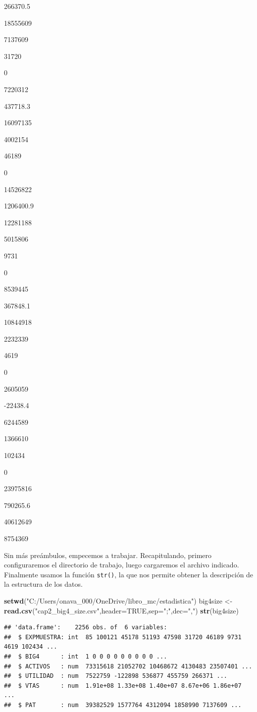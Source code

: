 \documentclass[]{book}
\newenvironment{Shaded}{\begin{snugshade}}{\end{snugshade}}
\newcommand{\KeywordTok}[1]{\textcolor[rgb]{0.13,0.29,0.53}{\textbf{#1}}}
\newcommand{\DataTypeTok}[1]{\textcolor[rgb]{0.13,0.29,0.53}{#1}}
\newcommand{\StringTok}[1]{\textcolor[rgb]{0.31,0.60,0.02}{#1}}
\newcommand{\OtherTok}[1]{\textcolor[rgb]{0.56,0.35,0.01}{#1}}
\newcommand{\NormalTok}[1]{#1}
\begin{document}
266370.5

18555609

7137609

31720

0

7220312

437718.3

16097135

4002154

46189

0

14526822

1206400.9

12281188

5015806

9731

0

8539445

367848.1

10844918

2232339

4619

0

2605059

-22438.4

6244589

1366610

102434

0

23975816

790265.6

40612649

8754369

Sin más preámbulos, empecemos a trabajar. Recapitulando, primero
configuraremos el directorio de trabajo, luego cargaremos el archivo
indicado. Finalmente usamos la función \texttt{str()}, la que nos
permite obtener la descripción de la estructura de los datos.

\begin{Shaded}
\begin{Highlighting}[]
\KeywordTok{setwd}\NormalTok{(}\StringTok{"C:/Users/onava_000/OneDrive/libro_mc/estadistica"}\NormalTok{)}
\NormalTok{big4size <-}\StringTok{ }\KeywordTok{read.csv}\NormalTok{(}\StringTok{"cap2_big4_size.csv"}\NormalTok{,}\DataTypeTok{header=}\OtherTok{TRUE}\NormalTok{,}\DataTypeTok{sep=}\StringTok{";"}\NormalTok{,}\DataTypeTok{dec=}\StringTok{","}\NormalTok{)}
\KeywordTok{str}\NormalTok{(big4size)}
\end{Highlighting}
\end{Shaded}

\begin{verbatim}
## 'data.frame':    2256 obs. of  6 variables:
##  $ EXPMUESTRA: int  85 100121 45178 51193 47598 31720 46189 9731 4619 102434 ...
##  $ BIG4      : int  1 0 0 0 0 0 0 0 0 0 ...
##  $ ACTIVOS   : num  73315618 21052702 10468672 4130483 23507401 ...
##  $ UTILIDAD  : num  7522759 -122898 536877 455759 266371 ...
##  $ VTAS      : num  1.91e+08 1.33e+08 1.40e+07 8.67e+06 1.86e+07 ...
##  $ PAT       : num  39382529 1577764 4312094 1858990 7137609 ...
\end{verbatim}
\end{document}

